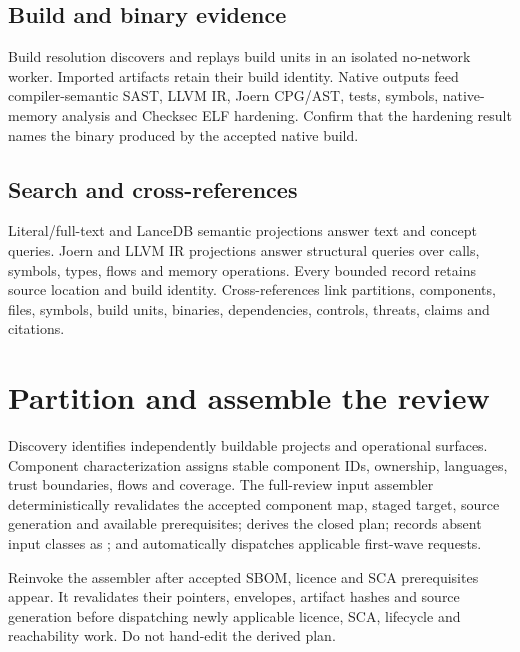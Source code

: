 \documentclass[10pt,a4paper]{article}
\begin{document}
\subsection{Build and binary evidence}
Build resolution discovers and replays build units in an isolated no-network worker. Imported
artifacts retain their build identity. Native outputs feed compiler-semantic SAST, LLVM IR,
Joern CPG/AST, tests, symbols, native-memory analysis and Checksec ELF hardening. Confirm that the
hardening result names the binary produced by the accepted native build.

\subsection{Search and cross-references}
Literal/full-text and LanceDB semantic projections answer text and concept queries. Joern and LLVM
IR projections answer structural queries over calls, symbols, types, flows and memory operations.
Every bounded record retains source location and build identity. Cross-references link partitions,
components, files, symbols, build units, binaries, dependencies, controls, threats, claims and
citations.

\section{Partition and assemble the review}
Discovery identifies independently buildable projects and operational surfaces. Component
characterization assigns stable component IDs, ownership, languages, trust boundaries, flows and
coverage. The full-review input assembler deterministically revalidates the accepted component map,
staged target, source generation and available prerequisites; derives the closed plan; records absent
input classes as ; and automatically dispatches applicable first-wave requests.

Reinvoke the assembler after accepted SBOM, licence and SCA prerequisites appear. It revalidates
their pointers, envelopes, artifact hashes and source generation before dispatching newly applicable
licence, SCA, lifecycle and reachability work. Do not hand-edit the derived plan.
\end{document}
